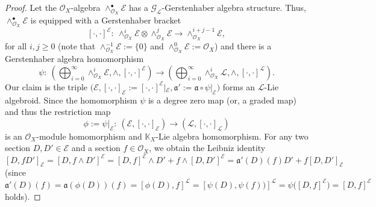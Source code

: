 \documentclass[pdftex]{sigma}
\numberwithin{equation}{section}
\theoremstyle{definition}
\begin{document}
\begin{proof}
	Let the $\mathcal{O}_X$-algebra $\wedge_{\mathcal{O}_X}^\bullet \mathcal{E}$ has a $\mathcal{G}_{\mathcal{L}}$-Gerstenhaber algebra structure.
	Thus, $\wedge_{\mathcal{O}_X}^\bullet \mathcal{E}$ is equipped with a Gerstenhaber bracket
\[
[\cdot,\cdot]^{\mathcal{E}}\colon \ \wedge_{\mathcal{O}_X}^i \mathcal{E} \otimes \wedge_{\mathcal{O}_X}^j \mathcal{E} \rightarrow \wedge_{\mathcal{O}_X}^{i+j-1} \mathcal{E},
\]
	for all $i,j \geq 0$ (note that $\wedge_{\mathcal{O}_X}^{-1} \mathcal{E}:=\{0\}$ and $\wedge_{\mathcal{O}_X}^{0} \mathcal{E}:=\mathcal{O}_X$) and there is a Gerstenhaber algebra homomorphism
\[
\psi\colon \ \left(\bigoplus^{\infty}_{i=0} \wedge_{\mathcal{O}_X}^i \mathcal{E}, \wedge, [\cdot,\cdot]^{\mathcal{E}}\right) \rightarrow \left(\bigoplus^{\infty}_{i=0} \wedge_{\mathcal{O}_X}^i \mathcal{L}, \wedge, [\cdot,\cdot]^{\mathcal{L}}\right).
\]
	Our claim is the triple $\bigl(\mathcal{E}, [\cdot,\cdot]_{\mathcal{E}}:= [\cdot,\cdot]^{\mathcal{E}}|_{\mathcal{E}}, \mathfrak{a'}:=\mathfrak{a}\circ \psi|_{\mathcal{E}}\bigr)$ forms an $\mathcal{L}$-Lie algebroid. Since the homomorphism ${\psi}$ is a degree zero map (or, a graded map) and thus the restriction map
\[
\phi:=\psi|_{\mathcal{E}}\colon \ (\mathcal{E}, [\cdot,\cdot]_{\mathcal{E}}) \rightarrow (\mathcal{L}, [\cdot,\cdot]_{\mathcal{L}})
\]
 is an $\mathcal{O}_X$-module homomorphism and $\mathbb{K}_X$-Lie algebra homomorphism. For any two section $D,D' \in \mathcal{E}$ and a section $f \in \mathcal{O}_X$, we obtain the Leibniz identity
\[
[D, f D']_{\mathcal{E}}=[D, f \wedge D']^{\mathcal{E}}
		=[D,f]^{\mathcal{E}}\wedge D'+ f\wedge [D,D']^{\mathcal{E}}
		=\mathfrak{a'}(D)(f) D'+f [D,D']_{\mathcal{E}}
\]
	(since ${\mathfrak{a}'}(D)(f)=\mathfrak{a}(\phi(D))(f)=[\phi(D),f]^{\mathcal{L}}=[\psi(D),\psi(f))]^{\mathcal{L}} =\psi\bigl([D,f]^{\mathcal{E}}\bigr)=[D,f]^{\mathcal{E}}$ holds).
	

\end{proof}
\end{document}
